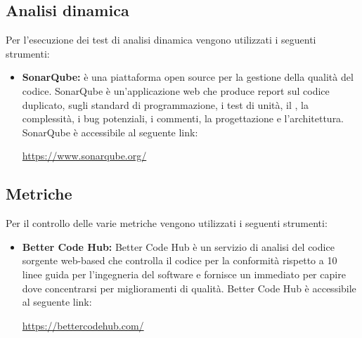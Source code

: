 \documentclass[openany,12pt,a4paper]{report}
\begin{document}
\subsection{Analisi dinamica}
Per l’esecuzione dei test di analisi dinamica vengono utilizzati i seguenti strumenti:
    \begin{itemize}
        \item \textbf{SonarQube:} è una piattaforma open source per la gestione della qualità del codice. SonarQube è un’applicazione web che produce report sul codice duplicato, sugli standard di programmazione, i test di unità, il , la complessità, i bug potenziali, i commenti, la progettazione e l’architettura. SonarQube è accessibile al seguente link: \\ \centerline{\url{https://www.sonarqube.org/}}
    \end{itemize}
    
\subsection{Metriche}
Per il controllo delle varie metriche vengono utilizzati i seguenti strumenti:
    \begin{itemize}
        \item \textbf{Better Code Hub:} Better Code Hub è un servizio di analisi del codice sorgente web-based che controlla il codice per la conformità rispetto a 10 linee guida per l'ingegneria del software e fornisce un  immediato per capire dove concentrarsi per miglioramenti di qualità. Better Code Hub è accessibile al seguente link:\\ \centerline{\url{https://bettercodehub.com/}}
    \end{itemize}
    
\end{document}
